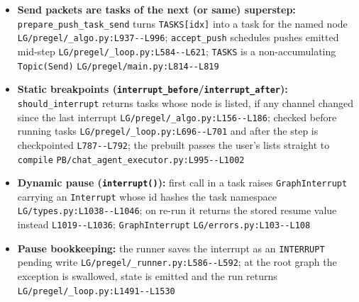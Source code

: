 \begin{itemize}
\item \textbf{Send packets are tasks of the next (or same) superstep:} \texttt{prepare\_\allowbreak{}push\_\allowbreak{}task\_\allowbreak{}send} turns \texttt{TASKS[idx]} into a task for the named node \texttt{LG/\allowbreak{}pregel/\allowbreak{}\_\allowbreak{}algo.\allowbreak{}py:\allowbreak{}L937-\allowbreak{}-\allowbreak{}L996}; \texttt{accept\_\allowbreak{}push} schedules pushes emitted mid-step \texttt{LG/\allowbreak{}pregel/\allowbreak{}\_\allowbreak{}loop.\allowbreak{}py:\allowbreak{}L584-\allowbreak{}-\allowbreak{}L621}; \texttt{TASKS} is a non-accumulating \texttt{Topic(\allowbreak{}Send)} \texttt{LG/\allowbreak{}pregel/\allowbreak{}main.\allowbreak{}py:\allowbreak{}L814-\allowbreak{}-\allowbreak{}L819}
\item \textbf{Static breakpoints (\texttt{interrupt\_\allowbreak{}before}/\texttt{interrupt\_\allowbreak{}after}):} \texttt{should\_\allowbreak{}interrupt} returns tasks whose node is listed, if any channel changed since the last interrupt \texttt{LG/\allowbreak{}pregel/\allowbreak{}\_\allowbreak{}algo.\allowbreak{}py:\allowbreak{}L156-\allowbreak{}-\allowbreak{}L186}; checked before running tasks \texttt{LG/\allowbreak{}pregel/\allowbreak{}\_\allowbreak{}loop.\allowbreak{}py:\allowbreak{}L696-\allowbreak{}-\allowbreak{}L701} and after the step is checkpointed \texttt{L787-\allowbreak{}-\allowbreak{}L792}; the prebuilt passes the user's lists straight to \texttt{compile} \texttt{PB/\allowbreak{}chat\_\allowbreak{}agent\_\allowbreak{}executor.\allowbreak{}py:\allowbreak{}L995-\allowbreak{}-\allowbreak{}L1002}
\item \textbf{Dynamic pause (\texttt{interrupt(\allowbreak{})}):} first call in a task raises \texttt{GraphInterrupt} carrying an \texttt{Interrupt} whose id hashes the task namespace \texttt{LG/\allowbreak{}types.\allowbreak{}py:\allowbreak{}L1038-\allowbreak{}-\allowbreak{}L1046}; on re-run it returns the stored resume value instead \texttt{L1019-\allowbreak{}-\allowbreak{}L1036}; \texttt{GraphInterrupt} \texttt{LG/\allowbreak{}errors.\allowbreak{}py:\allowbreak{}L103-\allowbreak{}-\allowbreak{}L108}
\item \textbf{Pause bookkeeping:} the runner saves the interrupt as an \texttt{INTERRUPT} pending write \texttt{LG/\allowbreak{}pregel/\allowbreak{}\_\allowbreak{}runner.\allowbreak{}py:\allowbreak{}L586-\allowbreak{}-\allowbreak{}L592}; at the root graph the exception is swallowed, state is emitted and the run returns \texttt{LG/\allowbreak{}pregel/\allowbreak{}\_\allowbreak{}loop.\allowbreak{}py:\allowbreak{}L1491-\allowbreak{}-\allowbreak{}L1530}

\end{itemize}
